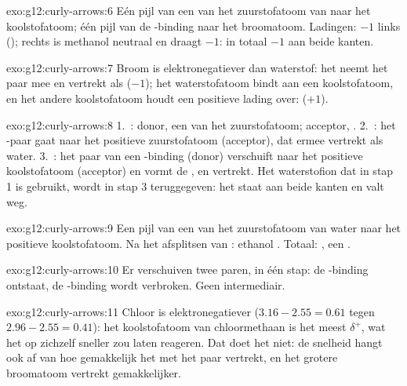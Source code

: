\begin{solution}{exo:g12:curly-arrows:6}
Eén pijl van een  van het zuurstofatoom van 
naar het koolstofatoom; één pijl van de -binding naar het
broomatoom. Ladingen: $-1$ links
(); rechts is methanol neutraal en draagt  $-1$:
in totaal $-1$ aan beide kanten.
\end{solution}

\begin{solution}{exo:g12:curly-arrows:7}
Broom is elektronegatiever dan waterstof: het neemt het paar mee en
vertrekt als  ($-1$); het waterstofatoom bindt aan een
koolstofatoom, en het andere koolstofatoom houdt een positieve lading
over:  ($+1$).
\end{solution}

\begin{solution}{exo:g12:curly-arrows:8}
1.~: donor, een 
van het zuurstofatoom; acceptor, . 2.~:
het -paar gaat naar het positieve zuurstofatoom (acceptor), dat
ermee vertrekt als water. 3.~: het paar van
een -binding (donor) verschuift naar het positieve koolstofatoom
(acceptor) en vormt de , en  vertrekt. Het
waterstofion dat in stap 1 is gebruikt, wordt in stap 3 teruggegeven:
het staat aan beide kanten en valt weg.
\end{solution}

\begin{solution}{exo:g12:curly-arrows:9}
Een pijl van een  van het zuurstofatoom van water
naar het positieve koolstofatoom. Na het afsplitsen van : ethanol
. Totaal:
, een .
\end{solution}

\begin{solution}{exo:g12:curly-arrows:10}
Er verschuiven twee paren, in één stap: de -binding ontstaat, de
-binding wordt verbroken. Geen intermediair.
\end{solution}

\begin{solution}{exo:g12:curly-arrows:11}
Chloor is elektronegatiever ($3.16 - 2.55 = 0.61$ tegen
$2.96 - 2.55 = 0.41$): het koolstofatoom van chloormethaan is het meest
$\delta^+$, wat het op zichzelf sneller zou laten reageren. Dat doet het
niet: de snelheid hangt ook af van hoe gemakkelijk het  met het
paar vertrekt, en het grotere broomatoom vertrekt gemakkelijker.
\end{solution}

